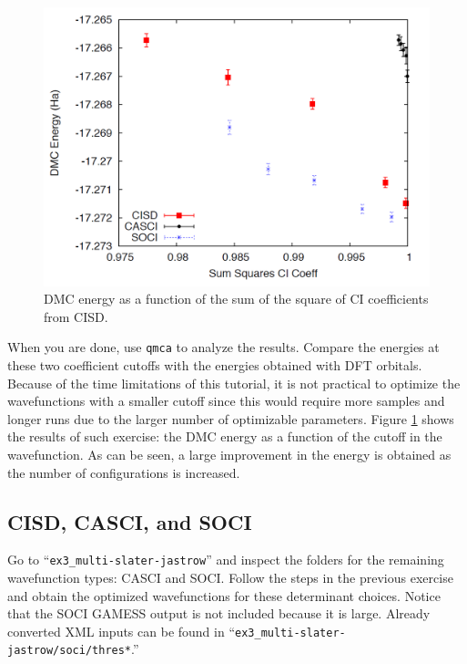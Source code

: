 \begin{figure}
\begin{center}
\includegraphics[trim = 0mm 0mm 0mm 0mm, clip,width=0.75\columnwidth]{./figures/lab_advanced_molecules_dmc_ci_cisd.png}
\end{center}
\caption{DMC energy as a function of the sum of the square of CI coefficients from CISD.}
\label{fig:lam_dmc_ci_cisd}
\end{figure}

When you are done, use \texttt{qmca} to analyze the results. Compare the energies at these two
coefficient cutoffs with the energies obtained with DFT orbitals. Because of the time limitations of this tutorial, it is not practical to optimize the wavefunctions with a smaller cutoff since this would require more samples and longer runs due to the larger number of optimizable parameters. Figure \ref{fig:lam_dmc_ci_cisd} shows the results of such exercise: the DMC energy as a function of the cutoff in the wavefunction. As can be seen, a large improvement in the energy is obtained as the number of configurations is increased.



\subsection{CISD, CASCI, and SOCI}

Go to “\texttt{ex3\_multi-slater-jastrow}” and inspect the folders for the remaining wavefunction types: CASCI and SOCI. Follow the steps in the previous exercise and obtain the optimized wavefunctions for these determinant choices. Notice that the SOCI GAMESS output is not included because it is large. Already converted XML inputs can be found in ``\texttt{ex3\_multi-slater-jastrow/soci/thres*}.'' %

